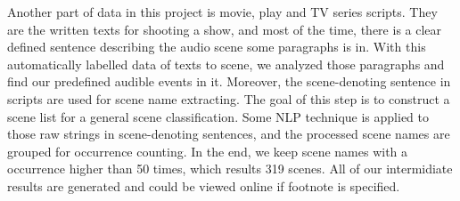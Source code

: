 Another part of data in this project is movie, play and TV series scripts. 
They are the written texts for shooting a show, and most of the time, there is a clear defined sentence describing the audio scene some paragraphs is in. 
With this automatically labelled data of texts to scene, we analyzed those paragraphs and find our predefined audible events in it. 
Moreover, the scene-denoting sentence in scripts are used for scene name extracting. 
The goal of this step is to construct a scene list for a general scene classification. 
Some NLP technique is applied to those raw strings in scene-denoting sentences, and the processed scene names are grouped for occurrence counting. 
In the end, we keep scene names with a occurrence higher than 50 times, which results 319 scenes. 
All of our intermidiate results are generated and could be viewed online if footnote is specified. 
